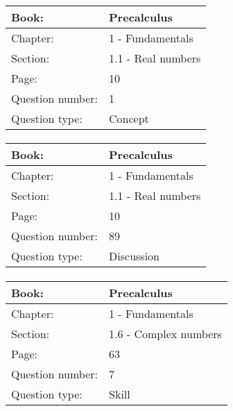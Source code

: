 \documentclass{article}
\begin{document}
   \paragraph{}
   \begin{tabularx}{1\textwidth}{
           p{}
           p{}
       }
       \toprule
       Book: & Precalculus
       \\
       \midrule
       Chapter: & 1 - Fundamentals
       \\
       \midrule
       Section: & 1.1 - Real numbers
       \\
       \midrule
       Page: & 10
       \\
       \midrule
       Question number: & 1
       \\
       \midrule
       Question type: & Concept
       \\
       \bottomrule
   \end{tabularx}



   \paragraph{}
   \begin{tabularx}{1\textwidth}{
           p{}
           p{}
       }
       \toprule
       Book: & Precalculus
       \\
       \midrule
       Chapter: & 1 - Fundamentals
       \\
       \midrule
       Section: & 1.1 - Real numbers
       \\
       \midrule
       Page: & 10
       \\
       \midrule
       Question number: & 89
       \\
       \midrule
       Question type: & Discussion
       \\
       \bottomrule
   \end{tabularx}



   \paragraph{}
   \begin{tabularx}{1\textwidth}{
           p{}
           p{}
       }
       \toprule
       Book: & Precalculus
       \\
       \midrule
       Chapter: & 1 - Fundamentals
       \\
       \midrule
       Section: & 1.6 - Complex numbers
       \\
       \midrule
       Page: & 63
       \\
       \midrule
       Question number: & 7
       \\
       \midrule
       Question type: & Skill
       \\
       \bottomrule
   \end{tabularx}
\end{document}
